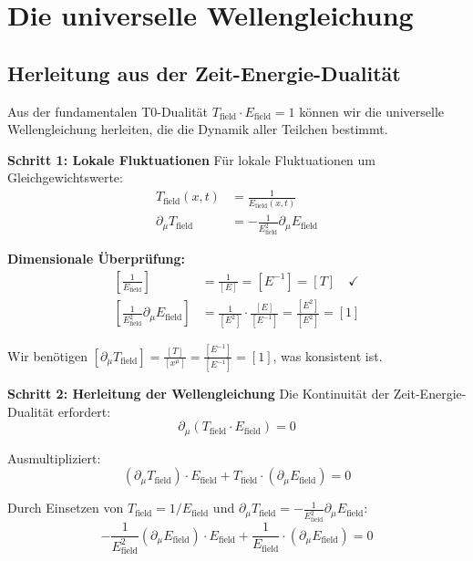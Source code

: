 \documentclass[12pt,a4paper]{report}
\begin{document}
	\section{Die universelle Wellengleichung}
	\label{sec:universal_wave_equation}
	
	\subsection{Herleitung aus der Zeit-Energie-Dualität}
	\label{subsec:derivation_wave_equation}
	
	Aus der fundamentalen T0-Dualität $T_{\text{field}} \cdot E_{\text{field}} = 1$ können wir die universelle Wellengleichung herleiten, die die Dynamik aller Teilchen bestimmt.
	
	\textbf{Schritt 1: Lokale Fluktuationen}
	Für lokale Fluktuationen um Gleichgewichtswerte:
	\begin{align}
		T_{\text{field}}(x,t) &= \frac{1}{E_{\text{field}}(x,t)} \\
		\partial_\mu T_{\text{field}} &= -\frac{1}{E_{\text{field}}^2} \partial_\mu E_{\text{field}}
	\end{align}
	
	\textbf{Dimensionale Überprüfung:}
	\begin{align}
		\left[\frac{1}{E_{\text{field}}}\right] &= \frac{1}{[E]} = [E^{-1}] = [T] \quad \checkmark \\
		\left[\frac{1}{E_{\text{field}}^2} \partial_\mu E_{\text{field}}\right] &= \frac{1}{[E^2]} \cdot \frac{[E]}{[E^{-1}]} = \frac{[E^2]}{[E^2]} = [1]
	\end{align}
	
	Wir benötigen $[\partial_\mu T_{\text{field}}] = \frac{[T]}{[x^\mu]} = \frac{[E^{-1}]}{[E^{-1}]} = [1]$, was konsistent ist.
	
	\textbf{Schritt 2: Herleitung der Wellengleichung}
	Die Kontinuität der Zeit-Energie-Dualität erfordert:
	\begin{equation}
		\partial_\mu(T_{\text{field}} \cdot E_{\text{field}}) = 0
	\end{equation}
	
	Ausmultipliziert:
	\begin{equation}
		(\partial_\mu T_{\text{field}}) \cdot E_{\text{field}} + T_{\text{field}} \cdot (\partial_\mu E_{\text{field}}) = 0
	\end{equation}
	
	Durch Einsetzen von $T_{\text{field}} = 1/E_{\text{field}}$ und $\partial_\mu T_{\text{field}} = -\frac{1}{E_{\text{field}}^2} \partial_\mu E_{\text{field}}$:
	\begin{equation}
		-\frac{1}{E_{\text{field}}^2} (\partial_\mu E_{\text{field}}) \cdot E_{\text{field}} + \frac{1}{E_{\text{field}}} \cdot (\partial_\mu E_{\text{field}}) = 0
	\end{equation}
	
\end{document}
